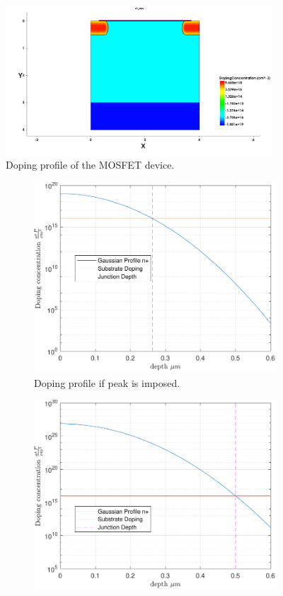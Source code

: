 \documentclass[11pt,a4paper]{article}
\begin{document}
		\begin{figure}
			\centering
			\includegraphics[width=100mm]{doping1}
			\caption{Doping profile of the MOSFET device.}
			\label{fig:doping}
		\end{figure}
		\begin{figure}
			\centering
			\begin{subfigure}[b]{0.45\textwidth}
				\centering
				\includegraphics[width=\textwidth]{gauss1.pdf}
				\caption{Doping profile if peak is imposed.}
				\label{gauss1}
			\end{subfigure}
			\hfill
			\begin{subfigure}[b]{0.45\textwidth}
				\centering
				\includegraphics[width=\textwidth]{gauss2.pdf}

\end{subfigure}
\end{figure}
\end{document}

